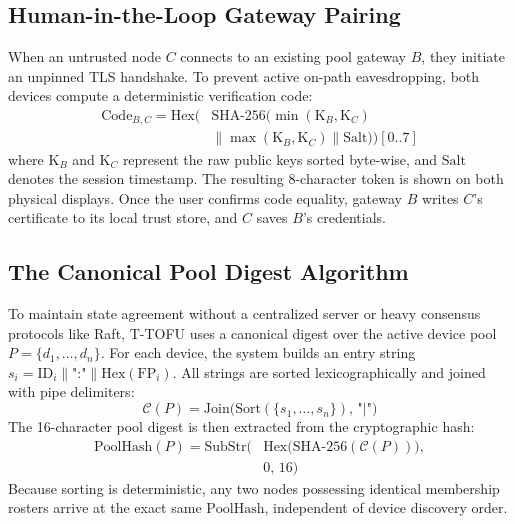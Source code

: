 \documentclass[conference]{IEEEtran}
\begin{document}
\subsection{Human-in-the-Loop Gateway Pairing}
When an untrusted node $C$ connects to an existing pool gateway $B$, they initiate an unpinned TLS handshake. To prevent active on-path eavesdropping, both devices compute a deterministic verification code:
\begin{equation}
\begin{split}
    \text{Code}_{B,C} = \text{Hex}\Big(&\text{SHA-256}\big(\min(\text{K}_B, \text{K}_C) \\
    &\parallel \max(\text{K}_B, \text{K}_C) \parallel \text{Salt}\big)\Big)[0..7]
\end{split}
\end{equation}
where $\text{K}_B$ and $\text{K}_C$ represent the raw public keys sorted byte-wise, and $\text{Salt}$ denotes the session timestamp. The resulting 8-character token is shown on both physical displays. Once the user confirms code equality, gateway $B$ writes $C$'s certificate to its local trust store, and $C$ saves $B$'s credentials.

\subsection{The Canonical Pool Digest Algorithm}
To maintain state agreement without a centralized server or heavy consensus protocols like Raft, T-TOFU uses a canonical digest over the active device pool $P = \{d_1, \dots, d_n\}$. For each device, the system builds an entry string $s_i = \text{ID}_i \parallel \text{":"} \parallel \text{Hex}(\text{FP}_i)$. All strings are sorted lexicographically and joined with pipe delimiters:
\begin{equation}
    \mathcal{C}(P) = \text{Join}\big(\text{Sort}(\{s_1, \dots, s_n\}),\, \text{"|"}\big)
\end{equation}
The 16-character pool digest is then extracted from the cryptographic hash:
\begin{equation}
\begin{split}
    \text{PoolHash}(P) = \text{SubStr}\Big(&\text{Hex}\big(\text{SHA-256}(\mathcal{C}(P))\big), \\
    &0,\, 16\Big)
\end{split}
\end{equation}
Because sorting is deterministic, any two nodes possessing identical membership rosters arrive at the exact same $\text{PoolHash}$, independent of device discovery order.
\end{document}
